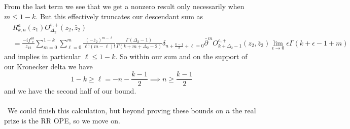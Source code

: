 \documentclass[11pt,letterpaper]{article}
\newcommand{\D}{\partial}
\begin{document}
From the last term we see that we get a nonzero result only necessarily when $m \leq 1 - k $. But this effectively truncates our descendant sum as \begin{equation}
\begin{aligned}
& R^a_{k,n} (z_1) O^{b,+}_{\Delta_2} (z_2, \bar{z}_2) \\
& = \frac{- i f^{ab}_{ \ \ c}}{z_{12}} \sum_{m=0}^{1-k} \sum_{\ell = 0}^m \frac{(- \bar{z}_2)^{m - \ell}}{\ell! (m-\ell)!} \frac{\Gamma(\Delta_2 - 1)}{\Gamma( k + m + \Delta_2 - 2)} \delta_{n + \frac{k- 1}{2} + \ell = 0} \bar{\D}^m O^{c,+}_{k + \Delta_2 - 1}(z_2, \bar{z}_2) \lim_{\epsilon \to 0} \epsilon \Gamma(k + \epsilon - 1 + m) 
\end{aligned}
\end{equation}
and implies in particular $\ell \leq 1 -k$. So within our sum and on the support of our Kronecker delta we have 
\begin{equation}
1 - k \geq \ell = -n - \frac{k-1}{2} \implies  n \geq \frac{k - 1}{2} 
\end{equation}
and we have the second half of our bound.\\
\\
\
We could finish this calculation, but beyond proving these bounds on $n$ the real prize is the RR OPE, so we move on.
\end{document}
